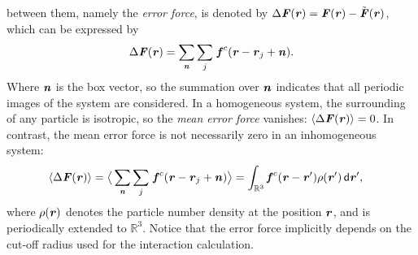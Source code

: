 \documentclass[aps,pre,preprint]{revtex4-1}
\renewcommand{\v}[1]{\textbf{\textit{#1}}}
\renewcommand{\d}[1]{\textsf{#1}}
\begin{document}
between them, namely the \emph{error force}, is denoted by $\Delta\v
F(\v r) = \v F(\v r) - \tilde{\v F}(\v r)$, which can be expressed by
\begin{align}
  \Delta\v F(\v r) = \sum_{\v n}\sum_{j}\, \v f^c(\v r - \v r_j + \v n).
\end{align}
Where $\v n$ is the box vector, so the summation over $\v n$ indicates
that all periodic images of the system are considered. In a
homogeneous system, the surrounding of any particle is isotropic, so
the \emph{mean error force} vanishes: $\langle\Delta\v F(\v r)\rangle
= 0$. In contrast, the mean error force is not necessarily zero in an
inhomogeneous system:
\begin{align} \label{eqn:tmp3} %
  \langle\Delta\v F(\v r)\rangle
  &=
  \big\langle
  \sum_{\v n}\sum_{j}\, \v f^c(\v r - \v r_j + \v n)
  \big\rangle 
  =
  \int_{\mathbb R^3}\v f^c(\v r - \v r')\rho(\v r')\,\d d\v r',
\end{align}
where $\rho(\v r)$ denotes the particle number density at the position
$\v r$, and is periodically extended to $\mathbb R^3$. Notice that the
error force implicitly depends on the cut-off radius used for the
interaction calculation.
\end{document}
